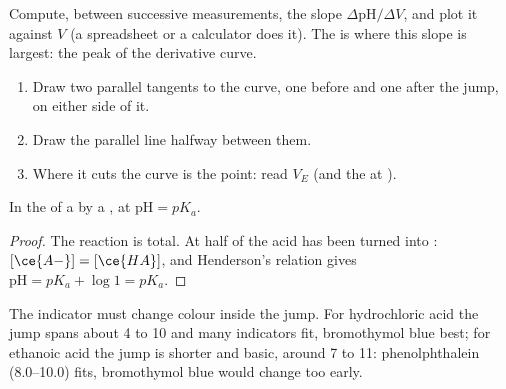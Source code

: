 \begin{method}\label{met:g12:ph-conductivity-titrations:derivative}
Compute, between successive measurements, the slope
$\Delta\mathrm{pH}/\Delta V$, and plot it against $V$ (a spreadsheet or a
calculator does it). The  is where this slope is
largest: the peak of the derivative curve.
\end{method}

\begin{method}\label{met:g12:ph-conductivity-titrations:tangent}
\begin{enumerate}
  \item Draw two parallel tangents to the curve, one before and one after
        the jump, on either side of it.
  \item Draw the parallel line halfway between them.
  \item Where it cuts the curve is the  point: read $V_E$ (and
        the  at ).
\end{enumerate}
\end{method}

\begin{proposition}[At half-equivalence, $\mathrm{pH} = pK_a$]\label{prop:g12:ph-conductivity-titrations:half}
In the  of a   by a , at
 $\mathrm{pH} = pK_a$.
\end{proposition}

\begin{proof}
The reaction  is total. At  half
of the acid has been turned into : $[\ce{A-}] = [\ce{HA}]$, and
Henderson's relation gives $\mathrm{pH} = pK_a + \log 1 = pK_a$.
\end{proof}

\begin{remark}\label{rem:g12:ph-conductivity-titrations:indicator}
The indicator must change colour inside the jump. For hydrochloric acid
the jump spans about  4 to 10 and many indicators fit, bromothymol blue
best; for ethanoic acid the jump is shorter and basic, around 7 to 11:
phenolphthalein (8.0--10.0) fits, bromothymol blue would change too
early.
\end{remark}

